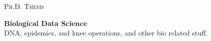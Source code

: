 \documentclass{article}
\begin{document}
\begin{titlepage}


    \begin{center}
        \vspace*{5.5cm}

        \LARGE
        \textsc{Ph.D. Thesis}


        \vspace{1.5cm}
        \Huge
        \textbf{Biological Data Science} \\
        \vspace{0.5cm}
        \normalsize
        DNA, epidemics, and knee operations, and other bio related stuff.

        \normalsize


\end{center}
\end{titlepage}
\end{document}
